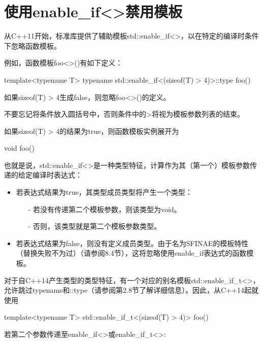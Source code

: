 \section{使用enable\_if<>禁用模板}
从C++11开始，标准库提供了辅助模板std::enable\_if<>，以在特定的编译时条件下忽略函数模板。

例如，函数模板foo<>()有如下定义：

\begin{cpp}
template<typename T>
typename std::enable_if<(sizeof(T) > 4)>::type
foo() {
}
\end{cpp}

如果sizeof(T) > 4生成false，则忽略foo<>()的定义。

\begin{notice}
不要忘记将条件放入圆括号中，否则条件中的>将视为模板参数列表的结束。
\end{notice}

如果sizeof(T) > 4的结果为true，则函数模板实例展开为

\begin{cpp}
void foo() {
}
\end{cpp}

也就是说，std::enable\_if<>是一种类型特征，计算作为其（第一个）模板参数传递的给定编译时表达式：

\begin{itemize}
\item 
若表达式结果为true，其类型成员类型将产生一个类型：

\begin{itemize}
\item[-]
若没有传递第二个模板参数，则该类型为void。
	
\item[-]
否则，该类型就是第二个模板参数类型。
\end{itemize}

\item 
若表达式结果为false，则没有定义成员类型。由于名为SFINAE的模板特性（替换失败不为过）（请参阅8.4节），这将忽略使用enable\_if表达式的函数模板。
\end{itemize}

对于自C++14产生类型的类型特征，有一个对应的别名模板std::enable\_if\_t<>，允许跳过typename和::type（请参阅第2.8节了解详细信息）。因此，从C++14起就使用

\begin{cpp}
template<typename T>
std::enable_if_t<(sizeof(T) > 4)>
foo() {
}
\end{cpp}

若第二个参数传递至enable\_if<>或enable\_if\_t<>:

